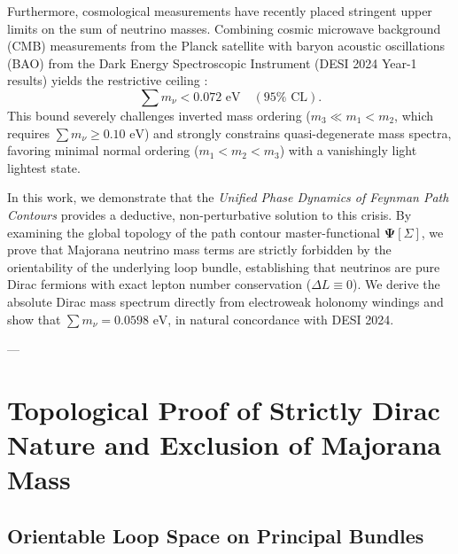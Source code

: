 \documentclass[11pt,a4paper]{article}
\theoremstyle{definition}
\begin{document}
Furthermore, cosmological measurements have recently placed stringent upper limits on the sum of neutrino masses. Combining cosmic microwave background (CMB) measurements from the Planck satellite with baryon acoustic oscillations (BAO) from the Dark Energy Spectroscopic Instrument (DESI 2024 Year-1 results) yields the restrictive ceiling \cite{DESI2024}:
\begin{equation}
    \sum m_\nu < 0.072\text{ eV} \quad (95\%\text{ CL}).
    \label{eq:desi_bound}
\end{equation}
This bound severely challenges inverted mass ordering ($m_3 \ll m_1 < m_2$, which requires $\sum m_\nu \ge 0.10\text{ eV}$) and strongly constrains quasi-degenerate mass spectra, favoring minimal normal ordering ($m_1 < m_2 < m_3$) with a vanishingly light lightest state.

In this work, we demonstrate that the \textit{Unified Phase Dynamics of Feynman Path Contours} \cite{Pavliuk2024_Monograph} provides a deductive, non-perturbative solution to this crisis. By examining the global topology of the path contour master-functional $\mathbf{\Psi}[\Sigma]$, we prove that Majorana neutrino mass terms are strictly forbidden by the orientability of the underlying loop bundle, establishing that neutrinos are pure Dirac fermions with exact lepton number conservation ($\Delta L \equiv 0$). We derive the absolute Dirac mass spectrum directly from electroweak holonomy windings and show that $\sum m_\nu = 0.0598\text{ eV}$, in natural concordance with DESI 2024.

---

\section{Topological Proof of Strictly Dirac Nature and Exclusion of Majorana Mass}

\subsection{Orientable Loop Space on Principal Bundles}
\end{document}
